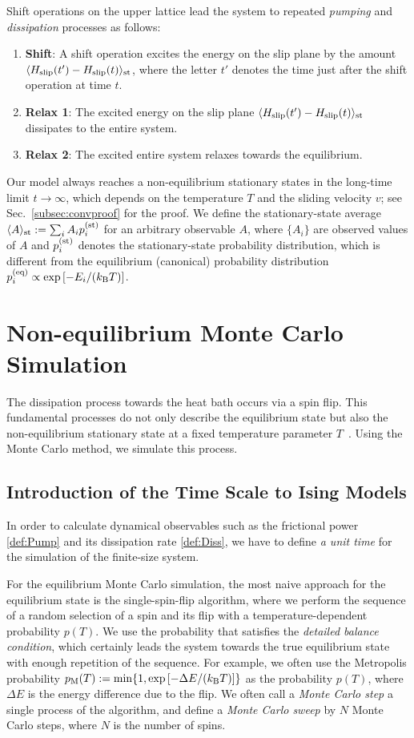 Shift operations on the upper lattice lead the system to repeated \textit{pumping} and \textit{dissipation} processes as follows:
\begin{enumerate}
	\item \textbf{Shift}: A shift operation excites the energy on the slip plane by the amount $\langle H_{\rm slip}(t')-H_{\rm slip}(t)\rangle_{\rm st}$, where the letter $t'$ denotes the time just after the shift operation at time $t$.
	\item \textbf{Relax 1}: The excited energy on the slip plane $\langle H_{\rm slip}(t')-H_{\rm slip}(t)\rangle_{\rm st}$ dissipates to the entire system.
	\item \textbf{Relax 2}: The excited entire system relaxes towards the equilibrium.
\end{enumerate}
Our model always reaches a non-equilibrium stationary states in the long-time limit $t\to\infty$, which depends on the temperature $T$ and the sliding velocity $v$; see Sec.~\ref{subsec:convproof} for the proof. We define the stationary-state average $\langle A\rangle_{\rm st}:=\sum_{i}A_{i}p^{(\rm st)}_{i}$ for an arbitrary observable $A$, where $\{A_{i}\}$ are observed values of $A$ and $p^{(\rm st)}_{i}$ denotes the stationary-state probability distribution, which is different from the equilibrium (canonical) probability distribution $p^{(\rm eq)}_{i}\propto\exp\left[-E_{i}/(k_{\rm B} T)\right]$.

\section{Non-equilibrium Monte Carlo Simulation}
The dissipation process towards the heat bath occurs via a spin flip. This fundamental processes do not only describe the equilibrium state but also the non-equilibrium stationary state at a fixed temperature parameter $T$~\cite{Glauber1963}. Using the Monte Carlo method, we simulate this process.

\subsection{Introduction of the Time Scale to Ising Models}
In order to calculate dynamical observables such as the frictional power \eqref{def:Pump} and its dissipation rate \eqref{def:Diss}, we have to define \textit{a unit time} for the simulation of the finite-size system. 

For the equilibrium Monte Carlo simulation, the most naive approach for the equilibrium state is the single-spin-flip algorithm, where we perform the sequence of a random selection of a spin and its flip with a temperature-dependent probability $p(T)$. We use the probability that satisfies the \textit{detailed balance condition}, which certainly leads the system towards the true equilibrium state with enough repetition of the sequence. For example, we often use the Metropolis probability $p_{\rm M}(T):=\min\{1,\exp\left[-\Delta E/(k_{\rm B}T)\right]\}$ as the probability $p(T)$, where $\Delta E$ is the energy difference due to the flip. We often call a \textit{Monte Carlo step} a single process of the algorithm, and define a \textit{Monte Carlo sweep} by $N$ Monte Carlo steps, where $N$ is the number of spins.

